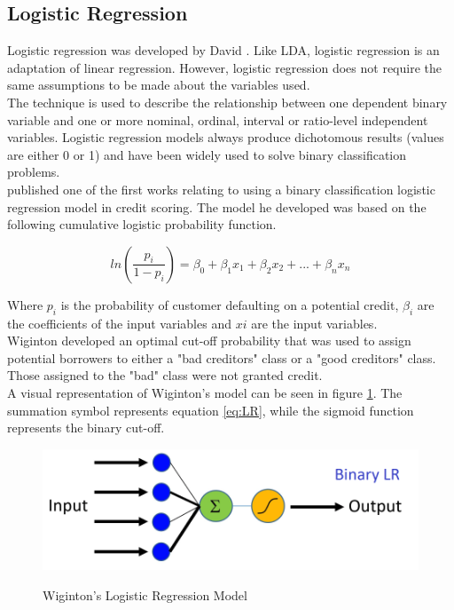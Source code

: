\subsection{Logistic Regression}

Logistic regression was developed by David \textcite{LogReg}. Like LDA, logistic regression is an adaptation of linear regression. However, logistic regression does not require the same assumptions to be made about the variables used. \\

The technique is used to describe the relationship between one dependent binary variable and one or more nominal, ordinal, interval or ratio-level independent variables. Logistic regression models always produce dichotomous results (values are either 0 or 1) and have been widely used to solve binary classification problems. \\

\textcite{LogRegWiginton} published one of the first works relating to using a binary classification logistic regression model in credit scoring. The model he developed was based on the following cumulative logistic probability function.

\vspace{15pt}

\begin{equation} \label{eq:LR}
ln(\frac{p_{i}}{1-p_{i}}) = \beta_{0} + \beta_{1}x_{1} + \beta_{2}x_{2}+ ... +  \beta_{n}x_{n}
\end{equation}

\vspace{15pt}

Where $p_{i}$ is the probability of customer defaulting on a potential credit, $\beta_{i}$ are the coefficients of the input variables and $x{i}$ are the input variables. \\

Wiginton developed an optimal cut-off probability that was used to assign potential borrowers to either a "bad creditors" class or a "good creditors" class. Those assigned to the "bad" class were not granted credit.  \\

A visual representation of Wiginton's model can be seen in figure \ref{fig:LR}. The summation symbol represents equation \ref{eq:LR}, while the sigmoid function represents the binary cut-off.  

\vspace{15pt}

\begin{figure}[!htb]
\centering
\includegraphics[width = \textwidth]{images/logistic_reg.png}
\caption{Wiginton's Logistic Regression Model}
\parencite{LogRegFig}
\label{fig:LR}
\end{figure}

